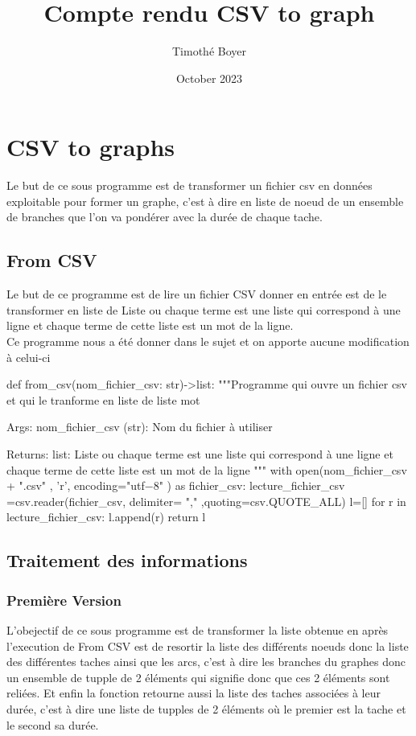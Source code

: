 \documentclass{article}
\title{Compte rendu CSV to graph}
\author{Timothé Boyer}
\date{October 2023}
\begin{document}
\maketitle

\section{CSV to graphs}
Le but de ce sous programme est de transformer un fichier csv en données exploitable pour former un graphe, c'est à dire en liste de noeud de un ensemble de branches que l'on va pondérer avec la durée de chaque tache.

\subsection{From CSV}
Le but de ce programme est de lire un fichier CSV donner en entrée est de le transformer en liste de Liste ou chaque terme est une liste qui correspond à une ligne et chaque terme de cette liste est un mot de la ligne.
\\
Ce programme nous a été donner dans le sujet et on apporte aucune modification à celui-ci 
\begin{python}
def from_csv(nom_fichier_csv: str)->list:
    """Programme qui ouvre un fichier csv et qui le tranforme en liste de liste mot

    Args:
        nom_fichier_csv (str): Nom du fichier à utiliser

    Returns:
        list: Liste ou chaque terme est une liste qui correspond à une ligne et chaque terme de cette liste est un mot de la ligne
    """
    with open(nom_fichier_csv + ".csv" , 'r', encoding="utf−8" ) as fichier_csv:
        lecture_fichier_csv =csv.reader(fichier_csv, delimiter= "," ,quoting=csv.QUOTE_ALL)
        l=[]
        for r in lecture_fichier_csv:
            l.append(r)
        return l
\end{python}

\subsection{Traitement des informations}
\subsubsection{Première Version}
L'obejectif de ce sous programme est de transformer la liste obtenue en après l'execution de From CSV est de resortir la liste des différents noeuds donc la liste des différentes taches ainsi que les arcs, c'est à dire les branches du graphes donc un ensemble de tupple de 2 éléments qui signifie donc que ces 2 éléments sont reliées. Et enfin la fonction retourne aussi la liste des taches associées à leur durée, c'est à dire une liste de tupples de 2 éléments où le premier est la tache et le second sa durée.
\end{document}
